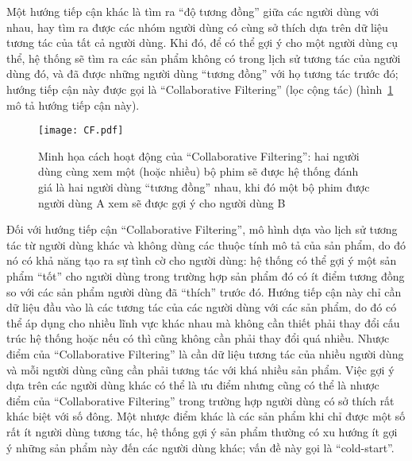 Một hướng tiếp cận khác là tìm ra ``độ tương đồng'' giữa các người dùng với nhau, hay tìm ra được các nhóm người dùng
có cùng sở thích dựa trên dữ liệu tương tác của tất cả người dùng. Khi đó, để có thể gợi ý cho một người dùng cụ thể,
hệ thống sẽ tìm ra các sản phẩm không có trong lịch sử tương tác của người dùng đó, và đã được những người dùng ``tương đồng'' với họ tương tác trước đó; hướng tiếp cận này được gọi là ``Collaborative Filtering'' (lọc cộng tác) (hình~\ref{fig_CF} mô tả hướng tiếp cận này).
\begin{figure}
    \centering
    \texttt{[image: CF.pdf]}
    \caption[Minh họa cách hoạt động của ``Collaborative Filtering'']{Minh họa cách hoạt động của ``Collaborative Filtering'': hai người dùng cùng xem một (hoặc nhiều) bộ phim 
    sẽ được hệ thống đánh giá là hai người dùng ``tương đồng'' nhau, khi đó một bộ phim được
    người dùng A xem sẽ được gợi ý cho người dùng B}
    \label{fig_CF}
\end{figure}
Đối với hướng tiếp cận ``Collaborative Filtering'', mô hình dựa vào lịch sử tương tác từ người dùng khác
và không dùng các thuộc tính mô tả của sản phẩm, do đó nó có khả năng tạo ra sự tình cờ cho người dùng:
hệ thống có thể gợi ý một sản phẩm ``tốt'' cho người dùng trong trường hợp sản phẩm đó có ít điểm tương đồng
so với các sản phẩm người dùng đã ``thích'' trước đó. Hướng tiếp cận này chỉ cần dữ liệu đầu vào là các tương tác của các người dùng với các sản phẩm, do đó có thể áp dụng cho nhiều lĩnh vực khác nhau mà không cần thiết phải thay đổi cấu trúc hệ thống 
hoặc nếu có thì cũng không cần phải thay đổi quá nhiều.
Nhược điểm của ``Collaborative Filtering'' là cần dữ liệu tương tác của nhiều người dùng và mỗi người dùng cũng cần phải tương tác với khá nhiều sản phẩm. Việc gợi ý dựa trên các người dùng khác có thể là ưu điểm nhưng cũng có thể là nhược điểm của ``Collaborative Filtering'' trong trường hợp người dùng có sở thích rất khác biệt với số đông.
Một nhược điểm khác là các sản phẩm khi chỉ được một số rất ít người dùng tương tác, hệ thống gợi ý sản phẩm thường có xu hướng ít gợi ý những sản phẩm này đến các người dùng khác; vấn đề này gọi là ``cold-start''.

